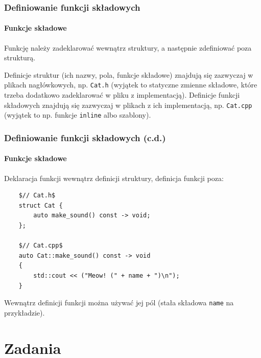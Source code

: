 \documentclass[aspectratio=169,10pt]{beamer}
\begin{document}
\begin{frame}
    \frametitle{Definiowanie funkcji składowych}
    \framesubtitle{Funkcje składowe}

    Funkcję należy zadeklarować wewnątrz struktury, a następnie zdefiniować poza
    strukturą.

    \vspace{1em}

    Definicje struktur (ich nazwy, pola, funkcje składowe) znajdują się
    zazwyczaj w plikach nagłówkowych, np. {\tt Cat.h} (wyjątek to statyczne
    zmienne składowe, które trzeba dodatkowo zadeklarować w pliku z
    implementacją).\newline
    Definicje funkcji składowych znajdują się zazwyczaj w plikach z ich
    implementacją, np. {\tt Cat.cpp} (wyjątek to np. funkcje {\tt inline} albo
    szablony).
\end{frame}

\begin{frame}[fragile]
    \frametitle{Definiowanie funkcji składowych (c.d.)}
    \framesubtitle{Funkcje składowe}

    Deklaracja funkcji wewnątrz definicji struktury, definicja funkcji poza:

    {\scriptsize
    \begin{lstlisting}
    $// Cat.h$
    struct Cat {
        auto make_sound() const -> void;
    };

    $// Cat.cpp$
    auto Cat::make_sound() const -> void
    {
        std::cout << ("Meow! (" + name + ")\n");
    }
    \end{lstlisting}}

    Wewnątrz definicji funkcji można używać jej pól (stała składowa {\tt name}
    na przykładzie).
\end{frame}

\section{Zadania}
\end{document}
